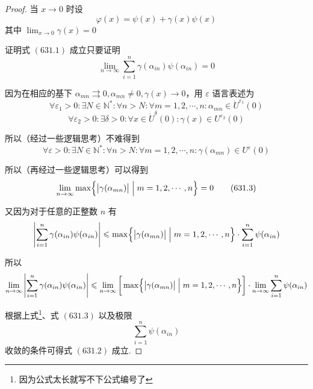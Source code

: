 \begin{proof}
    当 $x \rightarrow 0$ 时设
    \[\varphi(x) = \psi(x) + \gamma(x)\psi(x)\]
    其中 $\displaystyle \lim_{x \rightarrow 0} \gamma(x) = 0$

    证明式 $(631.1)$ 成立只要证明
    \[\lim_{n \rightarrow \infty} \sum_{i=1}^{n} \gamma(\alpha_{in})\psi(\alpha_{in}) = 0 \tag{631.2}\]

    因为在相应的基下 $\alpha_{mn} \rightrightarrows 0, \alpha_{mn} \neq 0, \gamma(x) \rightarrow 0$，用 $\varepsilon$ 语言表述为
    \[\forall \varepsilon_1 > 0: \exists N \in \mathbb{N}^*: \forall n > N: \forall m = 1,2,\cdots,n: \alpha_{mn} \in \mathring{U}^{\varepsilon_1}(0)\]
    \[\forall \varepsilon_2 > 0: \exists \delta > 0: \forall x \in \mathring{U}^\delta(0): \gamma(x) \in U^{\varepsilon_2}(0)\]

    所以（经过一些逻辑思考）不难得到
    \[\forall \varepsilon > 0: \exists N \in \mathbb{N}^*: \forall n > N: \forall m = 1,2,\cdots,n: \gamma(\alpha_{mn}) \in U^{\varepsilon}(0)\]

    所以（再经过一些逻辑思考）可以得到
    \[\lim_{n \rightarrow \infty} \max \Bigl\{ \bigl|\gamma(\alpha_{mn})\bigr| \Bigm| m=1,2,\cdots,n \Bigr\} = 0 \tag{631.3}\]

    又因为对于任意的正整数 $n$ 有
    \[\left|\sum_{i=1}^{n} \gamma(\alpha_{in})\psi(\alpha_{in})\right| \leqslant \max \Bigl\{ \bigl|\gamma(\alpha_{mn})\bigr| \Bigm| m=1,2,\cdots,n \Bigr\} \cdot \sum_{i=1}^{n} \psi(\alpha_{in})\]

    所以
    \[\lim_{n \rightarrow \infty} \left|\sum_{i=1}^{n} \gamma(\alpha_{in})\psi(\alpha_{in})\right| \leqslant \lim_{n \rightarrow \infty} \bigg[\max \Bigl\{ \bigl|\gamma(\alpha_{mn})\bigr| \Bigm| m=1,2,\cdots,n \Bigr\}\bigg] \cdot \lim_{n \rightarrow \infty} \sum_{i=1}^{n} \psi(\alpha_{in})\]

    根据上式\footnote{因为公式太长就写不下公式编号了}、式 $(631.3)$ 以及极限
    \[\sum_{i=1}^{n} \psi(\alpha_{in})\]
    收敛的条件可得式 $(631.2)$ 成立.
\end{proof}\vspace{9pt}

